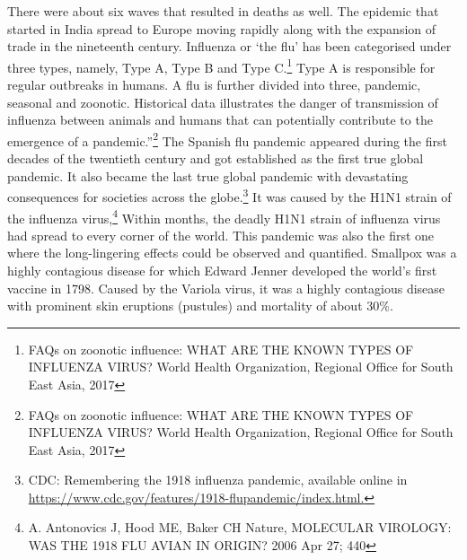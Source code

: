 \begin{multicols}{2}
\noi
There were about six waves that resulted in deaths as well. The epidemic that started in India
spread to Europe moving rapidly along with the expansion of trade in the nineteenth century.
Influenza or ‘the flu’ has been categorised under three types, namely, Type A, Type B and
Type C.\footnote{FAQs on zoonotic influence: WHAT ARE THE KNOWN TYPES OF INFLUENZA VIRUS? World Health Organization, Regional Office for South East Asia, 2017}  Type A is responsible for regular outbreaks in humans. A flu is further divided into
three, pandemic, seasonal and zoonotic. Historical data illustrates the danger of transmission
of influenza between animals and humans that can potentially contribute to the emergence of
a pandemic.”\footnote{FAQs on zoonotic influence: WHAT ARE THE KNOWN TYPES OF INFLUENZA VIRUS? World Health Organization, Regional Office for South East Asia, 2017} The Spanish flu pandemic appeared during the first decades of the twentieth
century and got established as the first true global pandemic. It also became the last true
global pandemic with devastating consequences for societies across the globe.\footnote{CDC: Remembering the 1918 influenza pandemic, available online in  \url{https://www.cdc.gov/features/1918-flupandemic/index.html.}} It was caused
by the H1N1 strain of the influenza virus,\footnote{A. Antonovics J, Hood ME, Baker CH Nature, MOLECULAR VIROLOGY: WAS THE 1918 FLU AVIAN IN ORIGIN? 2006 Apr 27; 440} Within months, the deadly H1N1 strain of influenza virus had spread to every corner of the world. This pandemic was also the first one where the long-lingering effects could be observed and quantified. Smallpox was a highly
contagious disease for which Edward Jenner developed the world’s first vaccine in 1798.
Caused by the Variola virus, it was a highly contagious disease with prominent skin eruptions
(pustules) and mortality of about 30\%.


\end{multicols}

